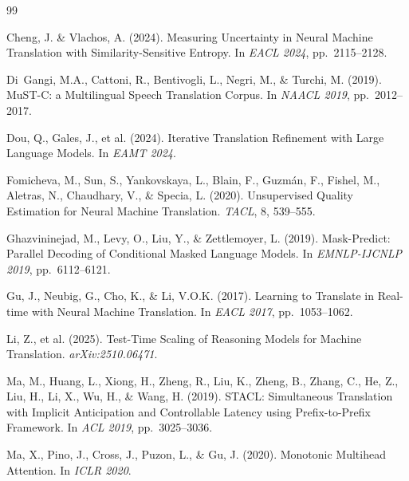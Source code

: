 
\begin{thebibliography}{99}

Cheng, J. \& Vlachos, A. (2024).
\newblock Measuring Uncertainty in Neural Machine Translation with Similarity-Sensitive Entropy.
\newblock In \emph{EACL 2024}, pp.\ 2115--2128.

Di~Gangi, M.A., Cattoni, R., Bentivogli, L., Negri, M., \& Turchi, M. (2019).
\newblock MuST-C: a Multilingual Speech Translation Corpus.
\newblock In \emph{NAACL 2019}, pp.\ 2012--2017.

Dou, Q., Gales, J., et al. (2024).
\newblock Iterative Translation Refinement with Large Language Models.
\newblock In \emph{EAMT 2024}.

Fomicheva, M., Sun, S., Yankovskaya, L., Blain, F., Guzm\'{a}n, F., Fishel, M., Aletras, N., Chaudhary, V., \& Specia, L. (2020).
\newblock Unsupervised Quality Estimation for Neural Machine Translation.
\newblock \emph{TACL}, 8, 539--555.

Ghazvininejad, M., Levy, O., Liu, Y., \& Zettlemoyer, L. (2019).
\newblock Mask-Predict: Parallel Decoding of Conditional Masked Language Models.
\newblock In \emph{EMNLP-IJCNLP 2019}, pp.\ 6112--6121.

Gu, J., Neubig, G., Cho, K., \& Li, V.O.K. (2017).
\newblock Learning to Translate in Real-time with Neural Machine Translation.
\newblock In \emph{EACL 2017}, pp.\ 1053--1062.

Li, Z., et al. (2025).
\newblock Test-Time Scaling of Reasoning Models for Machine Translation.
\newblock \emph{arXiv:2510.06471}.

Ma, M., Huang, L., Xiong, H., Zheng, R., Liu, K., Zheng, B., Zhang, C., He, Z., Liu, H., Li, X., Wu, H., \& Wang, H. (2019).
\newblock STACL: Simultaneous Translation with Implicit Anticipation and Controllable Latency using Prefix-to-Prefix Framework.
\newblock In \emph{ACL 2019}, pp.\ 3025--3036.

Ma, X., Pino, J., Cross, J., Puzon, L., \& Gu, J. (2020).
\newblock Monotonic Multihead Attention.
\newblock In \emph{ICLR 2020}.


\end{thebibliography}
